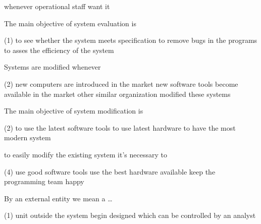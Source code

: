 \documentclass{article}
\begin{document}
\begin{questions}
\begin{exercise}
\begin{choice}
            \choice whenever operational staff want it
        \end{choice}
    \end{exercise}
    \begin{exercise}
        The main objective of system evaluation is
        \begin{choice}(1)
            \choice to see whether the system meets specification
            \choice {}
            \choice to remove bugs in the programs
            \choice to asses the efficiency of the system
        \end{choice}
    \end{exercise}
    \begin{exercise}
        Systems are modified whenever
        \begin{choice}(2)
            \choice {}
            \choice new computers are introduced in the market
            \choice new software tools become available in the market
            \choice other similar organization modified these systems
        \end{choice}
    \end{exercise}
    \begin{exercise}
        The main objective of system modification is
        \begin{choice}(2)
            \choice to use the latest software tools
            \choice {}
            \choice to use latest hardware
            \choice to have the most modern system
        \end{choice}
    \end{exercise}
    \begin{exercise}
        to easily modify the existing system it's necessary to
        \begin{choice}(4)
            \choice use good software tools
            \choice use the best hardware available
            \choice {}
            \choice keep the programming team happy
        \end{choice}
    \end{exercise}
    \begin{exercise}
        By an external entity we mean a \dots
        \begin{choice}(1)
            \choice unit outside the system begin designed which can be controlled by an analyst

\end{choice}
\end{exercise}
\end{questions}
\end{document}
